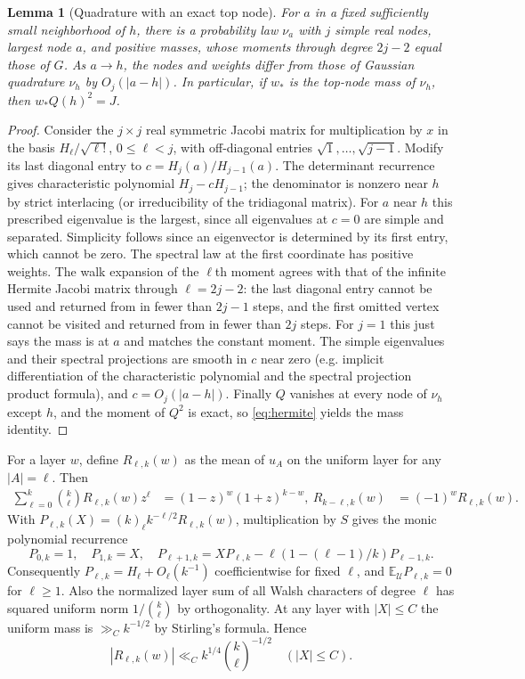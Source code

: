 \documentclass[11pt]{article}
\newtheorem{lemma}[theorem]{Lemma}
\theoremstyle{remark}\newtheorem{remark}[theorem]{Remark}
\newcommand{\E}{\mathbb E}
\newcommand{\U}{\mathcal U}
\begin{document}
\begin{lemma}[Quadrature with an exact top node]\label{lem:quad}
For $a$ in a fixed sufficiently small neighborhood of $h$, there is a probability law $\nu_a$ with $j$ simple real nodes, largest node $a$, and positive masses, whose moments through degree $2j-2$ equal those of $G$. As $a\to h$, the nodes and weights differ from those of Gaussian quadrature $\nu_h$ by $O_j(|a-h|)$. In particular, if $w_*$ is the top-node mass of $\nu_h$, then $w_*Q(h)^2=J$.
\end{lemma}
\begin{proof}
Consider the $j\times j$ real symmetric Jacobi matrix for multiplication by $x$ in the basis $H_\ell/\sqrt{\ell!}$, $0\le\ell<j$, with off-diagonal entries $\sqrt{1},\ldots,\sqrt{j-1}$. Modify its last diagonal entry to $c=H_j(a)/H_{j-1}(a)$. The determinant recurrence gives characteristic polynomial $H_j-cH_{j-1}$; the denominator is nonzero near $h$ by strict interlacing (or irreducibility of the tridiagonal matrix). For $a$ near $h$ this prescribed eigenvalue is the largest, since all eigenvalues at $c=0$ are simple and separated. Simplicity follows since an eigenvector is determined by its first entry, which cannot be zero. The spectral law at the first coordinate has positive weights. The walk expansion of the $\ell$th moment agrees with that of the infinite Hermite Jacobi matrix through $\ell=2j-2$: the last diagonal entry cannot be used and returned from in fewer than $2j-1$ steps, and the first omitted vertex cannot be visited and returned from in fewer than $2j$ steps. For $j=1$ this just says the mass is at $a$ and matches the constant moment. The simple eigenvalues and their spectral projections are smooth in $c$ near zero (e.g. implicit differentiation of the characteristic polynomial and the spectral projection product formula), and $c=O_j(|a-h|)$. Finally $Q$ vanishes at every node of $\nu_h$ except $h$, and the moment of $Q^2$ is exact, so \eqref{eq:hermite} yields the mass identity.
\end{proof}

For a layer $w$, define $R_{\ell,k}(w)$ as the mean of $u_A$ on the uniform layer for any $|A|=\ell$. Then
\begin{align}
 \sum_{\ell=0}^k\binom{k}{\ell} R_{\ell,k}(w)z^\ell&=(1-z)^w(1+z)^{k-w},\
 R_{k-\ell,k}(w)&=(-1)^w R_{\ell,k}(w).\label{eq:reflect}
\end{align}
With $P_{\ell,k}(X)=(k)_\ell k^{-\ell/2}R_{\ell,k}(w)$, multiplication by $S$ gives the monic polynomial recurrence
\[
 P_{0,k}=1,\quad P_{1,k}=X,\quad
 P_{\ell+1,k}=XP_{\ell,k}-\ell(1-(\ell-1)/k)P_{\ell-1,k}.
\]
Consequently $P_{\ell,k}=H_\ell+O_\ell(k^{-1})$ coefficientwise for fixed $\ell$, and $\E_\U P_{\ell,k}=0$ for $\ell\ge1$. Also the normalized layer sum of all Walsh characters of degree $\ell$ has squared uniform norm $1/\binom{k}{\ell}$ by orthogonality. At any layer with $|X|\le C$ the uniform mass is $\gg_C k^{-1/2}$ by Stirling's formula. Hence
\begin{equation}\label{eq:middle}
 |R_{\ell,k}(w)|\ll_C k^{1/4}\binom{k}{\ell}^{-1/2}\quad (|X|\le C).
\end{equation}
\end{document}
